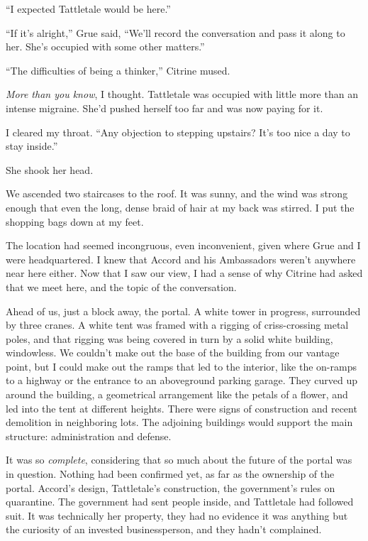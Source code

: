 ``I expected Tattletale would be here.''



``If it's alright,'' Grue said, ``We'll record the conversation and pass it along to her.  She's occupied with some other matters.''



``The difficulties of being a thinker,'' Citrine mused.



\emph{More than you know}, I thought.  Tattletale was occupied with little more than an intense migraine.  She'd pushed herself too far and was now paying for it.



I cleared my throat.  ``Any objection to stepping upstairs?  It's too nice a day to stay inside.''



She shook her head.



We ascended two staircases to the roof.  It was sunny, and the wind was strong enough that even the long, dense braid of hair at my back was stirred.  I put the shopping bags down at my feet.



The location had seemed incongruous, even inconvenient, given where Grue and I were headquartered.  I knew that Accord and his Ambassadors weren't anywhere near here either.  Now that I saw our view, I had a sense of why Citrine had asked that we meet here, and the topic of the conversation.



Ahead of us, just a block away, the portal.  A white tower in progress, surrounded by three cranes.  A white tent was framed with a rigging of criss-crossing metal poles, and that rigging was being covered in turn by a solid white building, windowless.  We couldn't make out the base of the building from our vantage point, but I could make out the ramps that led to the interior, like the on-ramps to a highway or the entrance to an aboveground parking garage.  They curved up around the building, a geometrical arrangement like the petals of a flower, and led into the tent at different heights.  There were signs of construction and recent demolition in neighboring lots.  The adjoining buildings would support the main structure: administration and defense.



It was so \emph{complete}, considering that so much about the future of the portal was in question.  Nothing had been confirmed yet, as far as the ownership of the portal.  Accord's design, Tattletale's construction, the government's rules on quarantine.  The government had sent people inside, and Tattletale had followed suit.  It was technically her property, they had no evidence it was anything but the curiosity of an invested businessperson, and they hadn't complained.



